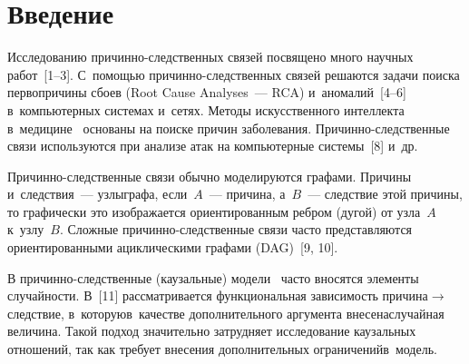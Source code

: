 
  
\vspace*{-6pt}



\thispagestyle{headings}

\begin{multicols}{2}

\label{st\stat}
  
  
  \section{Введение }
  
  Исследованию при\-чин\-но-след\-ст\-вен\-ных связей посвящено много 
научных работ~[1--3]. С~по\-мощью при\-чин\-но-след\-ст\-вен\-ных связей 
решаются задачи поиска первопричины сбоев (Root Cause Analyses~--- RCA) 
и~аномалий~[4--6] в~компьютерных системах и~сетях. Методы искусственного 
интеллекта в~медицине~\cite{3-gr, 7-gr} основаны на поиске причин заболевания. 
Причинно-следственные связи используются при анализе атак на компьютерные 
системы~[8] и~др. 
{

}
  
  Причинно-следственные связи обычно моделируются графами. Причины 
  и~следствия~--- узлы\linebreak графа, если~$A$~--- причина, а~$B$~--- следствие этой 
причины, то графически это изображается ориентированным ребром (дугой) от 
узла~$A$ к~узлу~$B$. Сложные при\-чин\-но-след\-ст\-вен\-ные связи часто 
представляются ориентированными ациклическими графами (DAG)~[9, 10]. 
  
  В причинно-следственные (каузальные) модели~\cite{3-gr, 11-gr} часто 
вносятся элементы случайности. В~[11] рассматривается функциональная 
зависимость при\-чи\-на\;$\to$\;след\-ст\-вие, в~которую\linebreak в~качестве 
дополнительного аргумента внесена\linebreak случайная величина. Такой подход 
значительно затрудняет исследование каузальных отношений, так как требует 
внесения дополнительных ограничений\linebreak в~мо\-дель. 


\end{multicols}
